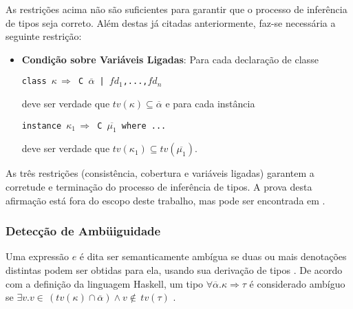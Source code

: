 As restri\c{c}\~oes acima n\~ao s\~ao suficientes para garantir que o processo de 
infer\^encia de tipos seja correto. Al\'em destas j\'a citadas anteriormente, faz-se necess\'aria a
seguinte restri\c{c}\~ao:

\begin{itemize}
	\item \textbf{Condi\c{c}\~ao sobre Vari\'aveis Ligadas}: Para cada declara\c{c}\~ao de classe 
	   \begin{center}
	    	\texttt{class $\kappa\,\Rightarrow$ C $\overline{\alpha}$ | $fd_{1}$,...,$fd_{n}$}
	   \end{center}
	   deve ser verdade que $tv(\kappa)\subseteq\overline{\alpha}$ e para cada inst\^ancia 
	   \begin{center}
	        \texttt{instance $\kappa_{1}\,\Rightarrow$ C $\overline{\mu_{1}}$ where ...}
	   \end{center}
	   deve ser verdade que $tv(\kappa_{1})\subseteq tv(\overline{\mu_{1}})$.
\end{itemize}

As tr\^es restri\c{c}\~oes (consist\^encia, cobertura e vari\'aveis ligadas) garantem a corretude e termina\c{c}\~ao do
processo de infer\^encia de tipos. A prova desta afirma\c{c}\~ao est\'a fora do escopo deste trabalho, mas pode ser
encontrada em \cite{Sulzmann06a}.

\subsubsection{Detec\c{c}\~ao de Amb\"uiguidade}

Uma express\~ao $e$ \'e dita ser semanticamente amb\'igua se duas ou mais denota\c{c}\~oes distintas podem ser obtidas
para ela, usando sua deriva\c{c}\~ao de tipos \cite{Mitchell96}. De acordo com a defini\c{c}\~ao da linguagem Haskell,
um tipo $\forall\overline{\alpha}.\kappa\Rightarrow\tau$ \'e considerado amb\'iguo se 
$\exists v.v\in\,(tv(\kappa)\cap\overline{\alpha})\land v\not\in\, tv(\tau)$ \cite{Haskell98}. 

